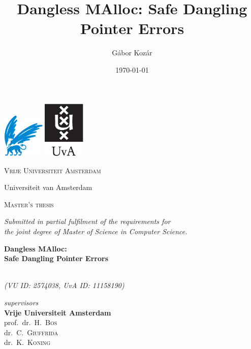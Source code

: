 \documentclass[12pt]{report}%
\title{Dangless MAlloc: Safe Dangling Pointer Errors}
\author{Gábor Kozár}
\date{\today}
\begin{document}
\makeatletter
\begin{titlepage}
	\centering
	\includegraphics[width=0.15\textwidth, trim={0 0.15cm 0 0}, clip]{img/vu.png} \hspace{1.3cm}
	\includegraphics[width=0.15\textwidth, trim={0 0.74cm 0 0}, clip]{img/uva.eps}\par\vspace{1cm}
	{\scshape\huge Vrije Universiteit Amsterdam \par Universiteit van Amsterdam \par}

	\vspace{1.5cm}

	{\scshape\LARGE Master's thesis\par \par
		\vspace{0.2cm}
		\small \textit{Submitted in partial fulfilment of the requirements for\\ the joint degree of Master of Science in Computer Science.}\par}
	\vspace{1.5cm}

	{\Huge\bfseries \rm \textbf{Dangless MAlloc:\\Safe Dangling Pointer Errors}\par}
	\vspace{1.5cm}

	{\Large\itshape\rm \noindent\textit{\@author}\\}
	\vspace{1mm}
	\textit{(VU ID: 2574038, UvA ID: 11158190)}
	\vfill

	\rm \noindent \textit{supervisors} \\ \vspace{0.15cm}
	\rm \textbf{Vrije Universiteit Amsterdam} \\
	prof.\ dr.\ H.\ \textsc{Bos} \\
	dr.\ C.\ \textsc{Giuffrida} \\
	dr.\ K.\ \textsc{Koning}
	\vfill
	
	{\large \@date\par}
\end{titlepage}
\makeatother
\end{document}
